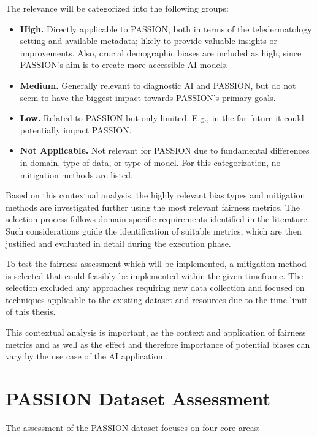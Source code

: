 \documentclass[12pt, a4paper, oneside]{book}   	%
\begin{document}
		The relevance will be categorized into the following groups:
		\begin{itemize}
			\item \textbf{High.} Directly applicable to PASSION, both in terms of the \gls{teledermatology} setting and available metadata; likely to provide valuable insights or improvements. Also, crucial demographic biases are included as high, since PASSION's aim is to create more accessible \gls{AI} models.
			\item \textbf{Medium.} Generally relevant to diagnostic \gls{AI} and PASSION, but do not seem to have the biggest impact towards PASSION's primary goals.
			\item \textbf{Low.} Related to PASSION but only limited. E.g., in the far future it could potentially impact PASSION.
			\item \textbf{Not Applicable.} Not relevant for PASSION due to fundamental differences in domain, type of data, or type of model. For this categorization, no mitigation methods are listed.
		\end{itemize}
		
		Based on this contextual analysis, the highly relevant bias types and mitigation methods are investigated further using the most relevant fairness metrics. The selection process follows domain-specific requirements identified in the literature. Such considerations guide the identification of suitable metrics, which are then justified and evaluated in detail during the execution phase.
		
		To test the fairness assessment which will be implemented, a mitigation method is selected that could feasibly be implemented within the given timeframe. The selection excluded any approaches requiring new data collection and focused on techniques applicable to the existing dataset and resources due to the time limit of this thesis.
		
		This contextual analysis is important, as the context and application of fairness metrics and as well as the effect and therefore importance of potential biases can vary by the use case of the \gls{AI} application \autocite{Mehrabi_2021,Barr_2025}.
		
		\section{PASSION Dataset Assessment}\label{chap:datasetAssessmentMethod}
		The assessment of the PASSION dataset focuses on four core areas:
		
\end{document}
